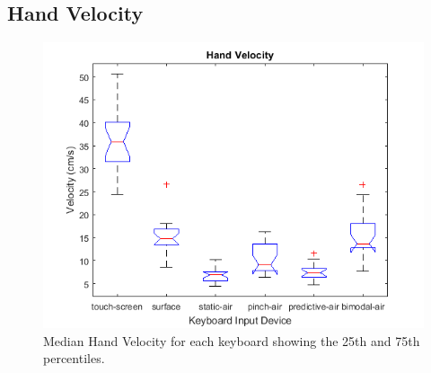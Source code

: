 \subsection{Hand Velocity}
\begin{figure}[h]
	\centering
	\includegraphics{fig_velocity_hand_boxplot}
	\caption[Hand Velocity Boxplot]{Median Hand Velocity for each keyboard showing the 25th and 75th percentiles.}
	\label{fig_velocity_hand_boxplot}
\end{figure}


